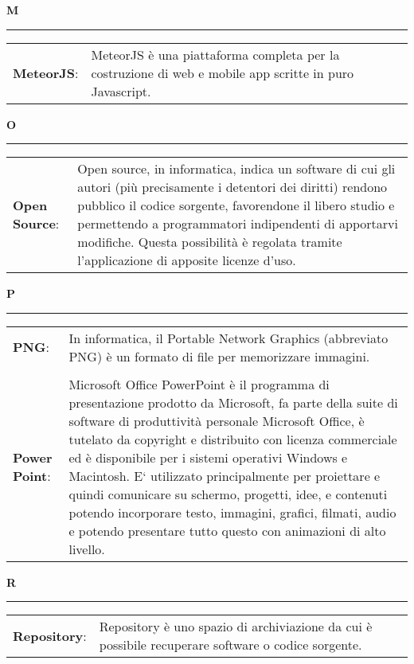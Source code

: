 \hfill\Huge{\textbf{M}}\\
\rule{16cm}{.6pt}
\normalsize
	\begin{longtable}{p{} p{}} 
	    \\
		    \textbf{MeteorJS}: & MeteorJS è una piattaforma completa per la costruzione di web e mobile app scritte in puro Javascript.\\
	\end{longtable}
	
\hfill\Huge{\textbf{O}}\\
\rule{16cm}{.6pt}
\normalsize
	\begin{longtable}{p{} p{}} 
	    \\
		    \textbf{Open Source}: & Open source, in informatica, indica un software di cui gli autori (più precisamente i detentori dei diritti) rendono pubblico il codice sorgente, favorendone il libero studio e permettendo a programmatori indipendenti di apportarvi modifiche. Questa possibilità è regolata tramite l'applicazione di apposite licenze d'uso.\\
	\end{longtable}
	
	\hfill\Huge{\textbf{P}}\\
\rule{16cm}{.6pt}
\normalsize
	\begin{longtable}{p{} p{}} 
	    \\
		    \textbf{PNG}: & In informatica, il Portable Network Graphics (abbreviato PNG) è un formato di file per memorizzare immagini.\\
		    \\
		    \textbf{Power Point}: & Microsoft Office PowerPoint è il programma di presentazione prodotto da Microsoft, fa parte della suite di software di produttività personale Microsoft Office, è tutelato da copyright e distribuito con licenza commerciale ed è disponibile per i sistemi operativi Windows e Macintosh. E` utilizzato principalmente per proiettare e quindi comunicare su schermo, progetti, idee, e contenuti potendo incorporare testo, immagini, grafici, filmati, audio e potendo presentare tutto questo con animazioni di alto livello.\\
	\end{longtable}
	
\hfill\Huge{\textbf{R}}\\
\rule{16cm}{.6pt}
\normalsize
	\begin{longtable}{p{} p{}} 
	    \\
		    \textbf{Repository}: & Repository è uno spazio di archiviazione da cui è possibile recuperare software o codice sorgente.\\
	\end{longtable}	
	
